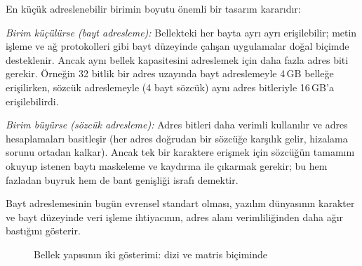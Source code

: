 \begin{karsilastirma}
En küçük adreslenebilir birimin boyutu önemli bir tasarım kararıdır:

\textit{Birim küçülürse (bayt adresleme):} Bellekteki her bayta ayrı ayrı erişilebilir; metin işleme ve ağ protokolleri gibi bayt düzeyinde çalışan uygulamalar doğal biçimde desteklenir. Ancak aynı bellek kapasitesini adreslemek için daha fazla adres biti gerekir. Örneğin 32 bitlik bir adres uzayında bayt adreslemeyle 4\,GB belleğe erişilirken, sözcük adreslemeyle (4 bayt sözcük) aynı adres bitleriyle 16\,GB'a erişilebilirdi.

\textit{Birim büyürse (sözcük adresleme):} Adres bitleri daha verimli kullanılır ve adres hesaplamaları basitleşir (her adres doğrudan bir sözcüğe karşılık gelir, hizalama sorunu ortadan kalkar). Ancak tek bir karaktere erişmek için sözcüğün tamamını okuyup istenen baytı maskeleme ve kaydırma ile çıkarmak gerekir; bu hem fazladan buyruk hem de bant genişliği israfı demektir.

Bayt adreslemesinin bugün evrensel standart olması, yazılım dünyasının karakter ve bayt düzeyinde veri işleme ihtiyacının, adres alanı verimliliğinden daha ağır bastığını gösterir.
\end{karsilastirma}

\begin{figure}[H]
\centering
{}
\caption[Bellek yapısının iki gösterimi]{Bellek yapısının iki gösterimi: dizi ve matris biçiminde}
\label{fig:bellek-yapisi}
\end{figure}

